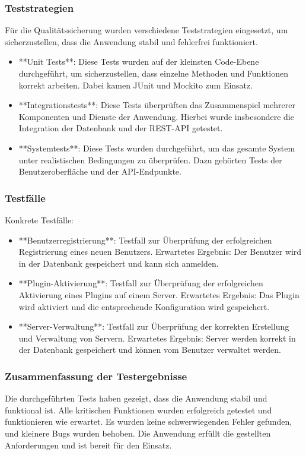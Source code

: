 \subsubsection{Teststrategien}\label{teststrategien}

Für die Qualitätssicherung wurden verschiedene Teststrategien eingesetzt, um sicherzustellen, dass die Anwendung stabil und fehlerfrei funktioniert.

\begin{itemize}
  \item
        **Unit Tests**: Diese Tests wurden auf der kleinsten Code-Ebene durchgeführt, um sicherzustellen, dass einzelne Methoden und Funktionen korrekt arbeiten. Dabei kamen JUnit und Mockito zum Einsatz.
  \item
        **Integrationstests**: Diese Tests überprüften das Zusammenspiel mehrerer Komponenten und Dienste der Anwendung. Hierbei wurde insbesondere die Integration der Datenbank und der REST-API getestet.
  \item
        **Systemtests**: Diese Tests wurden durchgeführt, um das gesamte System unter realistischen Bedingungen zu überprüfen. Dazu gehörten Tests der Benutzeroberfläche und der API-Endpunkte.
\end{itemize}

\subsubsection{Testfälle}\label{testfuxe4lle}

Konkrete Testfälle:

\begin{itemize}
  \item
        **Benutzerregistrierung**: Testfall zur Überprüfung der erfolgreichen Registrierung eines neuen Benutzers. Erwartetes Ergebnis: Der Benutzer wird in der Datenbank gespeichert und kann sich anmelden.
  \item
        **Plugin-Aktivierung**: Testfall zur Überprüfung der erfolgreichen Aktivierung eines Plugins auf einem Server. Erwartetes Ergebnis: Das Plugin wird aktiviert und die entsprechende Konfiguration wird gespeichert.
  \item
        **Server-Verwaltung**: Testfall zur Überprüfung der korrekten Erstellung und Verwaltung von Servern. Erwartetes Ergebnis: Server werden korrekt in der Datenbank gespeichert und können vom Benutzer verwaltet werden.
\end{itemize}

\subsubsection{Zusammenfassung der Testergebnisse}

Die durchgeführten Tests haben gezeigt, dass die Anwendung stabil und funktional ist. Alle kritischen Funktionen wurden erfolgreich getestet und funktionieren wie erwartet. Es wurden keine schwerwiegenden Fehler gefunden, und kleinere Bugs wurden behoben. Die Anwendung erfüllt die gestellten Anforderungen und ist bereit für den Einsatz.